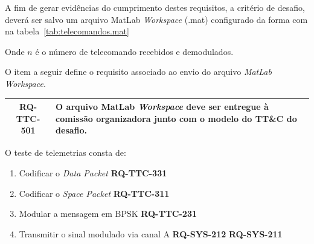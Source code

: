 A fim de gerar evidências do cumprimento destes requisitos, a critério de desafio, deverá ser salvo um arquivo MatLab \textit{Workspace} (.mat) configurado da forma com na tabela~\ref{tab:telecomandos.mat}

\begin{table}[H]
    \centering
    \caption{Definição do arquivo \textit{MatLab Workspace}}
    \label{tab:telecomandos.mat}
\end{table}

Onde $n$ é o número de telecomando recebidos e demodulados.

O item a seguir define o requisito associado ao envio do arquivo \textit{MatLab Workspace}.

\begin{table}[H]
    \centering
    \begin{tabular}{|c|p{}|}
        \hline
        \rowcolor{orange}
        \textbf{RQ-TTC-501} & \textbf{O arquivo MatLab \textit{Workspace} deve ser entregue à comissão organizadora junto com o modelo do TT\&C do desafio.} \\ \hline
    \end{tabular}
    \label{tab:rq-ttc-501}
\end{table}

O teste de telemetrias consta de:

\begin{enumerate}[label=(\roman*)]
    \item Codificar o \textit{Data Packet} \textbf{RQ-TTC-331}
    \item Codificar o \textit{Space Packet} \textbf{RQ-TTC-311}
    \item Modular a mensagem em BPSK \textbf{RQ-TTC-231}
    \item Transmitir o sinal modulado via canal A \textbf{RQ-SYS-212} \textbf{RQ-SYS-211}
\end{enumerate}

